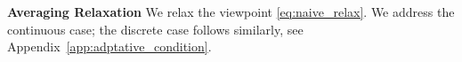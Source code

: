 \documentclass{article}
\newcommand{\jh}[1]{{\color{red} #1}}
\def\pl{{\text{PL}^\mu}}
\newcommand{\ac}{\text{AC}^{a}}
\newcommand{\qg}{\text{QG}_{+}^{L_0}}
\theoremstyle{plain}
\theoremstyle{definition}
\theoremstyle{remark}
\begin{document}
\noindent
\textbf{Averaging Relaxation \: } We relax the viewpoint \eqref{eq:naive_relax}. We address the continuous case; the discrete case follows similarly, see Appendix~\ref{app:adptative_condition}.
\end{document}
